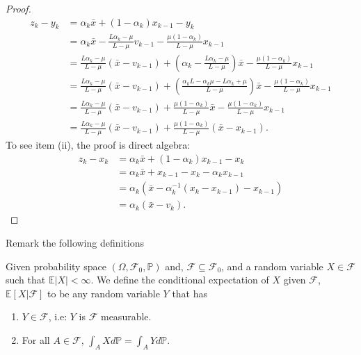 \documentclass[12pt]{article}
\newcommand{\expect}{\ensuremath{\mathbb E}}
\newcommand{\prob}{\ensuremath{\mathbb P}}
\begin{document}
\begin{proof}
            \begin{align*}
                z_k - y_k &= 
                \alpha_k \bar x + (1 - \alpha_k)x_{k - 1} - y_k
                \\
                &= \alpha_k \bar x 
                - \frac{L\alpha_k - \mu}{L - \mu} v_{k - 1} 
                - \frac{\mu(1 - \alpha_k)}{L - \mu} x_{k - 1}
                \\
                &= \frac{L\alpha_k - \mu}{L - \mu}(\bar x - v_{k - 1})
                + \left(
                    \alpha_k - \frac{L\alpha_k - \mu}{L - \mu}
                \right)\bar x
                - \frac{\mu(1 - \alpha_k)}{L - \mu} x_{k - 1}
                \\
                &= \frac{L\alpha_k - \mu}{L - \mu}(\bar x - v_{k - 1})
                + \left(
                    \frac{\alpha_kL - \alpha_k \mu - L\alpha_k + \mu}{L - \mu}
                \right)\bar x
                - \frac{\mu(1 - \alpha_k)}{L - \mu} x_{k - 1}
                \\
                &= \frac{L\alpha_k - \mu}{L - \mu}(\bar x - v_{k - 1})
                + \frac{\mu(1 - \alpha_k)}{L - \mu}\bar x
                - \frac{\mu(1 - \alpha_k)}{L - \mu} x_{k - 1}
                \\
                &= \frac{L\alpha_k - \mu}{L - \mu}(\bar x - v_{k - 1})
                + \frac{\mu(1 - \alpha_k)}{L - \mu}(\bar x - x_{k - 1}).
            \end{align*}
            To see item (ii), the proof is direct algebra: 
            \begin{align*}
                z_k - x_k &= \alpha_k \bar x + (1 - \alpha_k)x_{k - 1} - x_k
                \\
                &= \alpha_k \bar x + x_{k - 1} - x_k - \alpha_k x_{k - 1}
                \\
                &= \alpha_k(\bar x - \alpha_k^{-1}(x_k - x_{k - 1}) - x_{k - 1})
                \\
                &= \alpha_k (\bar x - v_k).
            \end{align*}
        \end{proof}
        Remark the following definitions
        \begin{definition}
            Given probability space $(\Omega, \mathcal F_0, \prob)$ and, $\mathcal F \subseteq \mathcal F_0$, and a random variable $X \in \mathcal F$ such that $\expect |X| < \infty$. 
            We define the conditional expectation of $X$ given $\mathcal F$, $\expect [X| \mathcal F]$ to be any random variable $Y$ that has 
            \begin{enumerate}[nosep]
                \item $Y \in \mathcal F$, i.e: $Y$ is $\mathcal F$ measurable. 
                \item For all $A \in \mathcal F$, $\int_A X d\prob = \int_A Y d\prob$. 
            \end{enumerate}
        \end{definition}
\end{document}
